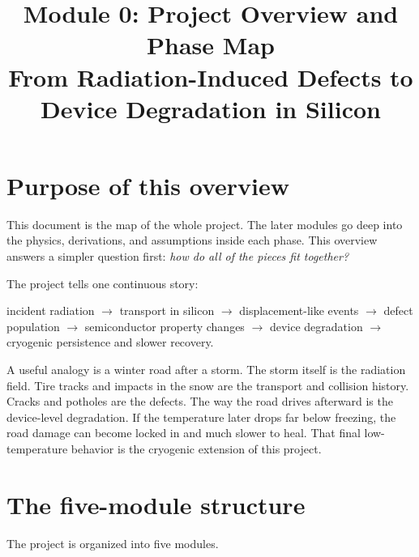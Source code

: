 \documentclass[11pt]{article}
\begin{document}
\title{Module 0: Project Overview and Phase Map \\ From Radiation-Induced Defects to Device Degradation in Silicon}
\author{}
\date{}
\maketitle

\section{Purpose of this overview}
This document is the map of the whole project. The later modules go deep into the physics, derivations, and assumptions inside each phase. This overview answers a simpler question first: \emph{how do all of the pieces fit together?}

The project tells one continuous story:
\begin{center}
incident radiation $\to$ transport in silicon $\to$ displacement-like events $\to$ defect population $\to$ semiconductor property changes $\to$ device degradation $\to$ cryogenic persistence and slower recovery.
\end{center}

A useful analogy is a winter road after a storm. The storm itself is the radiation field. Tire tracks and impacts in the snow are the transport and collision history. Cracks and potholes are the defects. The way the road drives afterward is the device-level degradation. If the temperature later drops far below freezing, the road damage can become locked in and much slower to heal. That final low-temperature behavior is the cryogenic extension of this project.

\section{The five-module structure}
The project is organized into five modules.
\end{document}
